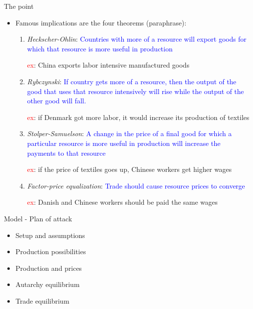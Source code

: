 \documentclass[ignorenonframetext,]{beamer}
\begin{document}
\begin{frame}{The point}

    \begin{itemize}
        \item Famous implications are the four theorems (paraphrase):
        \begin{enumerate}
            \item \emph{Heckscher-Ohlin}: \textcolor{blue}{Countries with more of a resource will export goods for which that resource is more useful in production} 

\textcolor{red}{ex}: China exports labor intensive manufactured goods
            \item \emph{Rybczynski}: \textcolor{blue}{If country gets more of a resource, then the output of the good that uses that resource intensively will rise while the output of the other good will fall.}

\textcolor{red}{ex}: if Denmark got more labor, it would increase its production of textiles
            \item \emph{Stolper-Samuelson}: \textcolor{blue}{A change in the price of a final good for which a particular resource is more useful in production will increase the payments to that resource}

\textcolor{red}{ex}: if the price of textiles goes up, Chinese workers get higher wages
            \item \emph{Factor-price equalization}: \textcolor{blue}{Trade should cause resource prices to converge}

\textcolor{red}{ex}: Danish and Chinese workers should be paid the same wages
        \end{enumerate}
    \end{itemize}

\end{frame}

\begin{frame}{Model - Plan of attack}

        \begin{itemize}
            \item Setup and assumptions
            \item Production possibilities
            \item Production and prices
            \item Autarchy equilibrium
            \item Trade equilibrium
        \end{itemize}

\end{frame}
\end{document}
